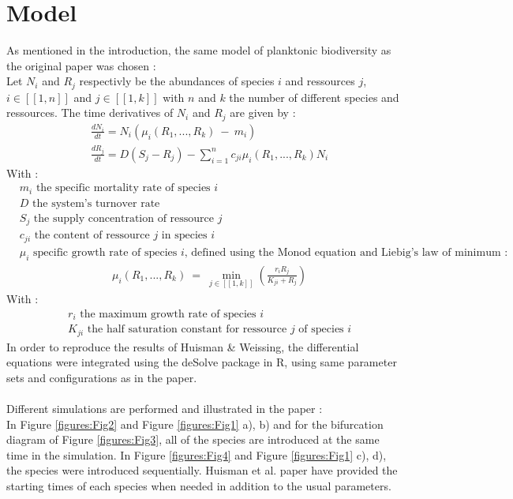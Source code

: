 \section{Model}
As mentioned in the introduction, the same model of planktonic biodiversity as the original paper\supercite{1999:Huisman} was chosen :\\
 Let $N_i$ and $R_j$ respectivly be the abundances of species $i$ and ressources $j$,$i\in[\![1,n]\!]$ and $j\in[\![1,k]\!]$ with $n$ and $k$ the number of different species and ressources. The time derivatives of $N_i$ and $R_j$ are given by : \\
\begin{align}
	& \frac{dN_i}{dt}= N_i(\mu_i(R_1,...,R_k)~-~m_i)\\
	& \frac{dR_j}{dt}= D(S_j-R_j) - \sum_{i=1}^n c_{ji} \mu_i(R_1,...,R_k)N_i
\end{align}
With : 
\begin{align*}
& m_i \text{ the specific mortality rate of species $i$}\\
& D \text{ the system's turnover rate}\\
& S_j \text{ the supply concentration of ressource $j$}\\
& c_{ji} \text{ the content of ressource $j$ in species $i$}\\
& \mu_i \text{ specific growth rate of species $i$, defined using the Monod equation and Liebig's law of minimum : }
\end{align*}
\begin{align}
&\mu_i(R_1,...,R_k)~=~\min_{j\in[\![1,k]\!]}(\frac{r_iR_j}{K_{ji}+R_j})
\end{align}
With : 
\begin{align*}
&r_i \text{ the maximum growth rate of species $i$}\\
&K_{	ji} \text{ the half saturation constant for ressource $j$ of species $i$}
\end{align*}
In order to reproduce the results of Huisman \& Weissing, the differential equations were integrated using the deSolve package in R, using same parameter sets and configurations as in the paper.\\
\\
Different simulations are performed and illustrated in the paper : \\
In Figure \ref{figures:Fig2} and Figure \ref{figures:Fig1} a), b) and for the bifurcation diagram of Figure \ref{figures:Fig3}, all of the species are introduced at the same time in the simulation. In Figure \ref{figures:Fig4} and Figure \ref{figures:Fig1} c), d), the species were introduced sequentially. Huisman et al. paper \supercite{1999:Huisman} have provided the starting times of each species when needed in addition to the usual parameters.\\
